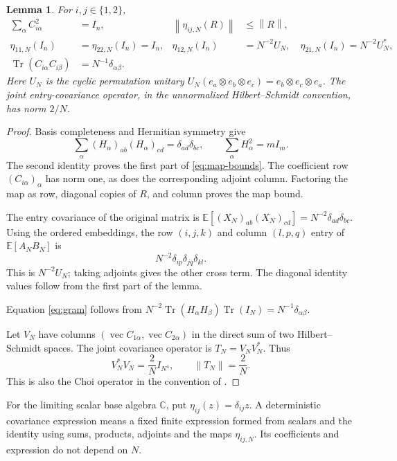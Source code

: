 \documentclass[11pt]{article}
\newtheorem{lemma}[theorem]{Lemma}
\DeclareMathOperator{\Tr}{Tr}
\newcommand{\E}{\mathbb E}
\newcommand{\C}{\mathbb C}
\newcommand{\norm}[1]{\left\|#1\right\|}
\begin{document}
\begin{lemma}\label{lem:covariance}
For $i,j\in\{1,2\}$,
\begin{align}
 \sum_\alpha C_{i\alpha}^2&=I_n,
 &\norm{\eta_{ij,N}(R)}&\le\norm R, \label{eq:map-bounds}\\
 \eta_{11,N}(I_n)&=\eta_{22,N}(I_n)=I_n,
 &\eta_{12,N}(I_n)&=N^{-2}U_N,\quad
 \eta_{21,N}(I_n)=N^{-2}U_N^*, \label{eq:identity-values}\\
 \Tr(C_{i\alpha}C_{i\beta})&=N^{-1}\delta_{\alpha\beta}.
 &&\label{eq:gram}
\end{align}
Here $U_N$ is the cyclic permutation unitary
$U_N(e_a\otimes e_b\otimes e_c)=e_b\otimes e_c\otimes e_a$.
The joint entry-covariance operator, in the unnormalized
Hilbert--Schmidt convention, has norm $2/N$.
\end{lemma}

\begin{proof}
Basis completeness and Hermitian symmetry give
\[
 \sum_\alpha (H_\alpha)_{ab}(H_\alpha)_{cd}
       =\delta_{ad}\delta_{bc},\qquad
 \sum_\alpha H_\alpha^2=mI_m.
\]
The second identity proves the first part of \eqref{eq:map-bounds}.
The coefficient row $(C_{i\alpha})_\alpha$ has norm one, as does
the corresponding adjoint column. Factoring the map as row, diagonal
copies of $R$, and column proves the map bound.

The entry covariance of the original matrix is
$\E[(X_N)_{ab}(X_N)_{cd}]=N^{-2}\delta_{ad}\delta_{bc}$.
Using the ordered embeddings, the row $(i,j,k)$ and column $(l,p,q)$
entry of $\E[A_NB_N]$ is
\[
 N^{-2}\delta_{ip}\delta_{jq}\delta_{kl}.
\]
This is $N^{-2}U_N$; taking adjoints gives the other cross term.
The diagonal identity values follow from the first part of the lemma.

Equation \eqref{eq:gram} follows from
$N^{-2}\Tr(H_\alpha H_\beta)\Tr(I_N)=N^{-1}\delta_{\alpha\beta}$.

Let $V_N$ have columns
$(\operatorname{vec}C_{1\alpha},\operatorname{vec}C_{2\alpha})$
in the direct sum of two Hilbert--Schmidt spaces.
The joint covariance operator is $T_N=V_NV_N^*$.
Thus
\begin{equation}\label{eq:choi}
 V_N^*V_N=\frac2N I_{N^4},\qquad \norm{T_N}=\frac2N.
\end{equation}
This is also the Choi operator in the convention of
\cite[Definition~1.5 and Remark~1.6]{JLNP}.
\end{proof}

For the limiting scalar base algebra $\C$, put
$\eta_{ij}(z)=\delta_{ij}z$.
A deterministic covariance expression means a fixed finite expression
formed from scalars and the identity using sums, products, adjoints
and the maps $\eta_{ij,N}$. Its coefficients and expression do not
depend on $N$.
\end{document}
